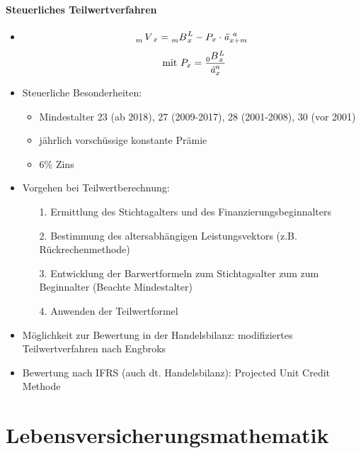 \documentclass[12pt]{report}
\theoremstyle{dotless}
\theoremstyle{definition}
\begin{document}
\subsubsection{Steuerliches Teilwertverfahren}
\begin{itemize}
	\item \begin{equation}
		\tensor[_{m}]{V}{}_x = \tensor[_{m}]{B}{}_x^L - P_x \cdot \text{\textit{ä}}_{x+m}^{\ a}
	\end{equation}
	\begin{align}
		\text{  mit  }P_x=\frac{\tensor[_{0}]{B}{}_x^L}{\text{\textit{ä}}_{x}^{a}}
	\end{align}
	\item Steuerliche Besonderheiten: 
		\begin{itemize}
			\item Mindestalter 23 (ab 2018), 27 (2009-2017), 28 (2001-2008), 30 (vor 2001)
			\item jährlich vorschüssige konstante Prämie
			\item 6$\%$ Zins
		\end{itemize}
	\item Vorgehen bei Teilwertberechnung:
		\begin{itemize}
			\item[1.] Ermittlung des Stichtagalters und des Finanzierungsbeginnalters
			\item[2.] Bestimmung des altersabhängigen Leistungsvektors (z.B. Rückrechenmethode)
			\item[3.] Entwicklung der Barwertformeln zum Stichtagsalter zum zum Beginnalter (Beachte Mindestalter)
			\item[4.] Anwenden der Teilwertformel
		\end{itemize}
	\item Möglichkeit zur Bewertung in der Handelsbilanz: modifiziertes Teilwertverfahren nach Engbroks
	\item Bewertung nach IFRS (auch dt. Handelsbilanz): Projected Unit Credit Methode
\end{itemize}












\chapter{Lebensversicherungsmathematik}
\end{document}
